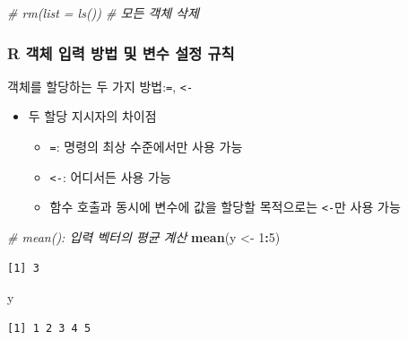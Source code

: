 \documentclass[
  11pt,
]{krantz}
\newenvironment{Shaded}{\begin{snugshade}}{\end{snugshade}}
\newcommand{\CommentTok}[1]{\textcolor[rgb]{0.37,0.37,0.37}{\textit{#1}}}
\newcommand{\DecValTok}[1]{\textcolor[rgb]{0.06,0.06,0.06}{#1}}
\newcommand{\KeywordTok}[1]{\textcolor[rgb]{0.27,0.27,0.27}{\textbf{#1}}}
\newcommand{\NormalTok}[1]{#1}
\newcommand{\OperatorTok}[1]{\textcolor[rgb]{0.43,0.43,0.43}{\textbf{#1}}}
\newcommand{\StringTok}[1]{\textcolor[rgb]{0.5,0.5,0.5}{#1}}
\providecommand{\tightlist}{%
  \setlength{\itemsep}{0pt}\setlength{\parskip}{0pt}}
\begin{document}
\begin{Shaded}
\begin{Highlighting}[]
\CommentTok{# rm(list = ls()) # 모든 객체 삭제}
\end{Highlighting}
\end{Shaded}

\normalsize

\hypertarget{r-object-nam-rule}{%
\subsubsection*{R 객체 입력 방법 및 변수 설정 규칙}\label{r-object-nam-rule}}


객체를 할당하는 두 가지 방법:\texttt{=}, \texttt{\textless{}-}

\begin{itemize}
\tightlist
\item
  두 할당 지시자의 차이점

  \begin{itemize}
  \tightlist
  \item
    \texttt{=}: 명령의 최상 수준에서만 사용 가능
  \item
    \texttt{\textless{}-}: 어디서든 사용 가능
  \item
    함수 호출과 동시에 변수에 값을 할당할 목적으로는 \texttt{\textless{}-}만 사용 가능
  \end{itemize}
\end{itemize}

\footnotesize

\begin{Shaded}
\begin{Highlighting}[]
\CommentTok{# mean(): 입력 벡터의 평균 계산}
\KeywordTok{mean}\NormalTok{(y <-}\StringTok{ }\DecValTok{1}\OperatorTok{:}\DecValTok{5}\NormalTok{)}
\end{Highlighting}
\end{Shaded}

\begin{verbatim}
[1] 3
\end{verbatim}

\begin{Shaded}
\begin{Highlighting}[]
\NormalTok{y}
\end{Highlighting}
\end{Shaded}

\begin{verbatim}
[1] 1 2 3 4 5
\end{verbatim}
\end{document}
